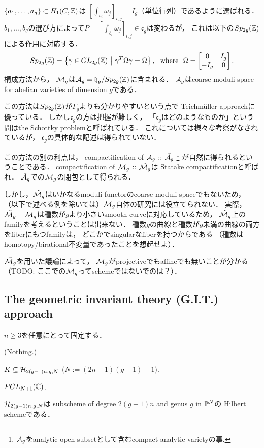 \documentclass[a4paper]{jsarticle}
\begin{document}
    $\{a_1,\dots,a_g\} \subset H_1(C, \mathbb{Z})$は
    $[\int_{b_i} \omega_j ]_{i,j}=I_g$（単位行列）であるように選ばれる．
    $b_1,\dots,b_g$の選び方によって$P=[\int_{b_i} \omega_j ]_{i,j} \in \mathfrak{c}_g$は変わるが，
    これは以下の$Sp_{2g}(\mathbb{Z})$による作用に対応する．
    \[
        Sp_{2g}(\mathbb{Z})=
        \left\{
            \gamma \in GL_{2g}(\mathbb{Z})
            ~\middle|~
            \gamma^T \Omega \gamma=\Omega
        \right\},
        ~~\text{where}~~
        \Omega=\begin{bmatrix} 0 & I_g \\ -I_g & 0 \end{bmatrix}.
    \]
    構成方法から，
    $\mathcal{M}_g$は$\mathcal{A}_g=\mathfrak{h}_g/Sp_{2g}(\mathbb{Z})$に含まれる．
    $\mathcal{A}_g$はcoarse moduli space for abelian varieties of dimension $g$である．

    この方法は$Sp_{2g}(\mathbb{Z})$が$\Gamma_g$よりも分かりやすいという点で
    Teichm\"uller approachに優っている．
    しかし$\mathfrak{c}_g$の方は把握が難しく，
    「$\mathfrak{c}_g$はどのようなものか」という問はthe Schottky problemと呼ばれている．
    これについては様々な考察がなされているが，
    $\mathfrak{c}_g$の具体的な記述は得られていない．

    この方法の別の利点は，
    compactification of $\mathcal{A}_g$ :: $\tilde{\mathcal{A}_g}$
    \footnote{ $\mathcal{A}_g$をanalytic open subsetとして含むcompact analytic varietyの事. }
    が自然に得られるということである．
    compactification of $\mathcal{M}_g$ :: $\tilde{\mathcal{M}_g}$は
    Statake compactificationと呼ばれ．
    $\tilde{\mathcal{A}_g}$での$\mathcal{M}_g$の閉包として得られる．
    
    しかし，$\tilde{\mathcal{M}_g}$はいかなるmoduli functorのcoarse moduli spaceでもないため，
    （以下で述べる例を除いては）$\mathcal{M}_g$自体の研究には役立てられない．
    実際，$\tilde{\mathcal{M}_g}-\mathcal{M}_g$は種数が$g$より小さいsmooth curveに対応しているため，
    $\tilde{\mathcal{M}_g}$上のfamilyを考えるということは出来ない．
    種数$g$の曲線と種数が$g$未満の曲線の両方をfiberにもつfamilyは，
    どこかでsingularなfiberを持つからである
    （種数はhomotopy/birational不変量であったことを想起せよ）．

    $\tilde{\mathcal{M}_g}$を用いた議論によって，
    $\mathcal{M}_g$がprojectiveでもaffineでも無いことが分かる
    （TODO: ここでの$\mathcal{M}_g$ってschemeではないでのは？）．

    \subsection{The geometric invariant theory (G.I.T.) approach}
    $n \geq 3$を任意にとって固定する．
    \begin{description}[leftmargin=!,labelwidth=\widthof{\bfseries Parameter Space}]
        \item[Extra Data] (Nothing.)
        \item[Parameter Space] $K \subseteq \mathcal{H}_{2(g-1)n, g, N}$ ($N:=(2n-1)(g-1)-1$).
        \item[Group] $PGL_{N+1}(\mathbb{C})$.
    \end{description}
    $\mathcal{H}_{2(g-1)n, g, N}$は
    subscheme of degree $2(g-1)n$ and genus $g$ in $\mathbb{P}^N$の
    Hilbert schemeである．
\end{document}
